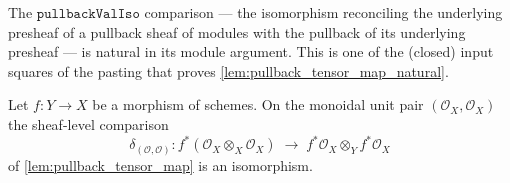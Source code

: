 \begin{lemma}\leanok
  \label{lem:pullback_val_iso_natural}
  The \(\mathtt{pullbackValIso}\) comparison --- the isomorphism reconciling the underlying
  presheaf of a pullback sheaf of modules with the pullback of its underlying presheaf ---
  is natural in its module argument. This is one of the (closed) input squares of the
  pasting that proves \cref{lem:pullback_tensor_map_natural}.
\end{lemma}

\begin{lemma}\leanok
  \label{lem:pullback_tensor_iso_unit}
  Let \(f : Y \to X\) be a morphism of schemes. On the monoidal unit pair
  \((\mathcal{O}_X, \mathcal{O}_X)\) the sheaf-level comparison
  \[
    \delta_{(\mathcal{O},\mathcal{O})} :
      f^*(\mathcal{O}_X \otimes_X \mathcal{O}_X)
      \;\longrightarrow\;
      f^*\mathcal{O}_X \otimes_Y f^*\mathcal{O}_X
  \]
  of \cref{lem:pullback_tensor_map} is an isomorphism.
\end{lemma}

